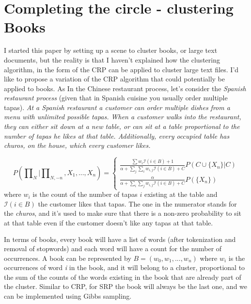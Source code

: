 \documentclass[12pt,a4paper]{article}
\begin{document}
\section{Completing the circle - clustering Books}
I started this paper by setting up a scene to cluster books, or large text documents, but the reality is that I haven't explained how the clustering algorithm, in the form of the CRP can be applied to cluster large text files. I'd like to propose a variation of the CRP algorithm that could potentially be applied to books. As In the Chinese restaurant process, let's consider the \textit{Spanish restaurant process} (given that in Spanish cuisine you usually order multiple tapas). \textit{At a Spanish restaurant a customer can order multiple dishes from a menu with unlimited possible tapas. When a customer walks into the restaurant, they can either sit down at a new table, or can sit at a table proportional to the number of tapas he likes at that table. Additionally, every occupied table has churos, on the house, which every customer likes.}

$$P(\prod\nolimits_{N}|\prod\nolimits_{N, -n}, X_{1}, ..., X_{n}) = \left \{
    \begin{array}{ll}
		\frac{\sum w_{i}\mathcal{I}({i}\in B) + 1}{\alpha + \sum_j \sum_i w_{i,j}\mathcal{I}(i \in B) + C}P(C \cup \{X_{n}\}|C)\\
		\frac{\alpha}{\alpha+\sum_i \sum_j w_{i,j}\mathcal{I}(i \in B) + C }P(\{X_{n}\}) 
	\end{array}
\right.$$
where $w_{i}$ is the count of the number of tapas $i$ existing at the table and $\mathcal{I}({i}\in B)$ the customer likes that tapas. The one in the numerator stands for the \textit{churos}, and it's used to make sure that there is a non-zero probability to sit at that table even if the customer doesn't like any tapas at that table. 

In terms of books, every book will have a list of words (after tokenization and removal of stopwords) and each word will have a count for the number of occurrences. A book can be represented by $B=(w_{0}, w_{1}, ..., w_{n})$ where $w_{i}$ is the occurrences of word \textit{i} in the book, and it will belong to a cluster, proportional to the sum of the counts of the words existing in the book that are already part of the cluster. Similar to CRP, for SRP the book will always be the last one, and we can be implemented using Gibbs sampling.
\end{document}
